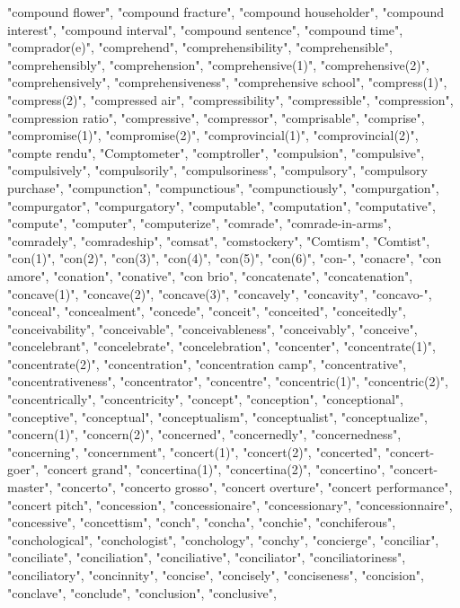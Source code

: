 "compound flower",
"compound fracture",
"compound householder",
"compound interest",
"compound interval",
"compound sentence",
"compound time",
"comprador(e)",
"comprehend",
"comprehensibility",
"comprehensible",
"comprehensibly",
"comprehension",
"comprehensive(1)",
"comprehensive(2)",
"comprehensively",
"comprehensiveness",
"comprehensive school",
"compress(1)",
"compress(2)",
"compressed air",
"compressibility",
"compressible",
"compression",
"compression ratio",
"compressive",
"compressor",
"comprisable",
"comprise",
"compromise(1)",
"compromise(2)",
"comprovincial(1)",
"comprovincial(2)",
"compte rendu",
"Comptometer",
"comptroller",
"compulsion",
"compulsive",
"compulsively",
"compulsorily",
"compulsoriness",
"compulsory",
"compulsory purchase",
"compunction",
"compunctious",
"compunctiously",
"compurgation",
"compurgator",
"compurgatory",
"computable",
"computation",
"computative",
"compute",
"computer",
"computerize",
"comrade",
"comrade-in-arms",
"comradely",
"comradeship",
"comsat",
"comstockery",
"Comtism",
"Comtist",
"con(1)",
"con(2)",
"con(3)",
"con(4)",
"con(5)",
"con(6)",
"con-",
"conacre",
"con amore",
"conation",
"conative",
"con brio",
"concatenate",
"concatenation",
"concave(1)",
"concave(2)",
"concave(3)",
"concavely",
"concavity",
"concavo-",
"conceal",
"concealment",
"concede",
"conceit",
"conceited",
"conceitedly",
"conceivability",
"conceivable",
"conceivableness",
"conceivably",
"conceive",
"concelebrant",
"concelebrate",
"concelebration",
"concenter",
"concentrate(1)",
"concentrate(2)",
"concentration",
"concentration camp",
"concentrative",
"concentrativeness",
"concentrator",
"concentre",
"concentric(1)",
"concentric(2)",
"concentrically",
"concentricity",
"concept",
"conception",
"conceptional",
"conceptive",
"conceptual",
"conceptualism",
"conceptualist",
"conceptualize",
"concern(1)",
"concern(2)",
"concerned",
"concernedly",
"concernedness",
"concerning",
"concernment",
"concert(1)",
"concert(2)",
"concerted",
"concert-goer",
"concert grand",
"concertina(1)",
"concertina(2)",
"concertino",
"concert-master",
"concerto",
"concerto grosso",
"concert overture",
"concert performance",
"concert pitch",
"concession",
"concessionaire",
"concessionary",
"concessionnaire",
"concessive",
"concettism",
"conch",
"concha",
"conchie",
"conchiferous",
"conchological",
"conchologist",
"conchology",
"conchy",
"concierge",
"conciliar",
"conciliate",
"conciliation",
"conciliative",
"conciliator",
"conciliatoriness",
"conciliatory",
"concinnity",
"concise",
"concisely",
"conciseness",
"concision",
"conclave",
"conclude",
"conclusion",
"conclusive",
